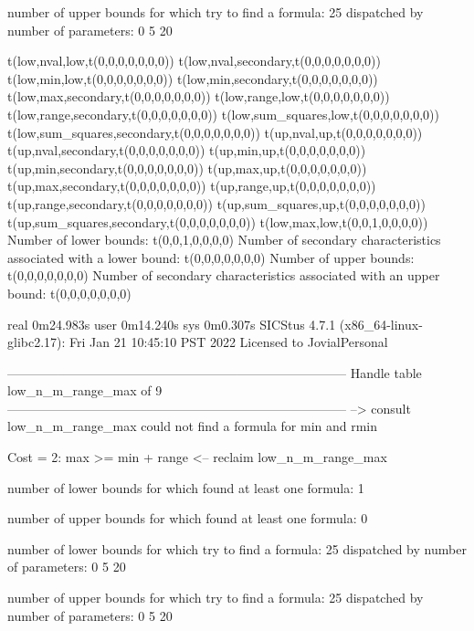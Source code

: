 number of upper bounds for which try to find a formula: 25
dispatched by number of parameters: 0  5  20

t(low,nval,low,t(0,0,0,0,0,0,0))
t(low,nval,secondary,t(0,0,0,0,0,0,0))
t(low,min,low,t(0,0,0,0,0,0,0))
t(low,min,secondary,t(0,0,0,0,0,0,0))
t(low,max,secondary,t(0,0,0,0,0,0,0))
t(low,range,low,t(0,0,0,0,0,0,0))
t(low,range,secondary,t(0,0,0,0,0,0,0))
t(low,sum_squares,low,t(0,0,0,0,0,0,0))
t(low,sum_squares,secondary,t(0,0,0,0,0,0,0))
t(up,nval,up,t(0,0,0,0,0,0,0))
t(up,nval,secondary,t(0,0,0,0,0,0,0))
t(up,min,up,t(0,0,0,0,0,0,0))
t(up,min,secondary,t(0,0,0,0,0,0,0))
t(up,max,up,t(0,0,0,0,0,0,0))
t(up,max,secondary,t(0,0,0,0,0,0,0))
t(up,range,up,t(0,0,0,0,0,0,0))
t(up,range,secondary,t(0,0,0,0,0,0,0))
t(up,sum_squares,up,t(0,0,0,0,0,0,0))
t(up,sum_squares,secondary,t(0,0,0,0,0,0,0))
t(low,max,low,t(0,0,1,0,0,0,0))
Number of lower bounds:                                             t(0,0,1,0,0,0,0)
Number of secondary characteristics associated with a lower bound:  t(0,0,0,0,0,0,0)
Number of upper bounds:                                             t(0,0,0,0,0,0,0)
Number of secondary characteristics associated with an upper bound: t(0,0,0,0,0,0,0)

real	0m24.983s
user	0m14.240s
sys	0m0.307s
SICStus 4.7.1 (x86_64-linux-glibc2.17): Fri Jan 21 10:45:10 PST 2022
Licensed to JovialPersonal


--------------------------------------------------------------------------------
Handle table low_n_m_range_max of 9
--------------------------------------------------------------------------------
--> consult low_n_m_range_max
could not find a formula for min and rmin

Cost =  2:  max >= min + range
<-- reclaim low_n_m_range_max

number of lower bounds for which found at least one formula: 1

number of upper bounds for which found at least one formula: 0

number of lower bounds for which try to find a formula: 25
dispatched by number of parameters: 0  5  20

number of upper bounds for which try to find a formula: 25
dispatched by number of parameters: 0  5  20

